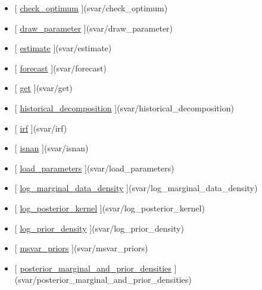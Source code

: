 \documentclass[letterpaper,10pt,english]{sphinxmanual}
\begin{document}
\label{classes/models/@svar/svar:methods}\begin{itemize}
\item {} 
{[} {\hyperref[classes/models/@svar/svar:check-optimum]{check\_optimum}} {]}(svar/check\_optimum)

\item {} 
{[} {\hyperref[classes/models/@svar/svar:draw-parameter]{draw\_parameter}} {]}(svar/draw\_parameter)

\item {} 
{[} {\hyperref[classes/models/@svar/svar:estimate]{estimate}} {]}(svar/estimate)

\item {} 
{[} {\hyperref[classes/models/@svar/svar:forecast]{forecast}} {]}(svar/forecast)

\item {} 
{[} {\hyperref[classes/models/@svar/svar:get]{get}} {]}(svar/get)

\item {} 
{[} {\hyperref[classes/models/@svar/svar:historical-decomposition]{historical\_decomposition}} {]}(svar/historical\_decomposition)

\item {} 
{[} {\hyperref[classes/models/@svar/svar:irf]{irf}} {]}(svar/irf)

\item {} 
{[} {\hyperref[classes/models/@svar/svar:isnan]{isnan}} {]}(svar/isnan)

\item {} 
{[} {\hyperref[classes/models/@svar/svar:load-parameters]{load\_parameters}} {]}(svar/load\_parameters)

\item {} 
{[} {\hyperref[classes/models/@svar/svar:log-marginal-data-density]{log\_marginal\_data\_density}} {]}(svar/log\_marginal\_data\_density)

\item {} 
{[} {\hyperref[classes/models/@svar/svar:log-posterior-kernel]{log\_posterior\_kernel}} {]}(svar/log\_posterior\_kernel)

\item {} 
{[} {\hyperref[classes/models/@svar/svar:log-prior-density]{log\_prior\_density}} {]}(svar/log\_prior\_density)

\item {} 
{[} {\hyperref[classes/models/@svar/svar:msvar-priors]{msvar\_priors}} {]}(svar/msvar\_priors)

\item {} 
{[} {\hyperref[classes/models/@svar/svar:posterior-marginal-and-prior-densities]{posterior\_marginal\_and\_prior\_densities}} {]}(svar/posterior\_marginal\_and\_prior\_densities)


\end{itemize}
\end{document}
